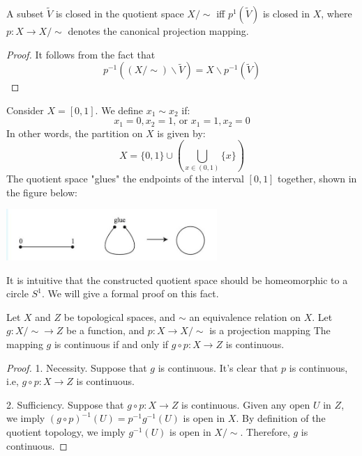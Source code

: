\begin{proposition} A subset \(\widetilde{V}\) is closed in the quotient space \(X/ \sim\) iff \({p}^{1}\left( \widetilde{V}\right)\) is closed in \(X\), where \(p: X \rightarrow  X/ \sim\) denotes the canonical projection mapping.
\end{proposition}
\begin{proof} It follows from the fact that
\[
{p}^{-1}\left( {\left( {X/ \sim  }\right)  \smallsetminus  \widetilde{V}}\right)  = X \smallsetminus  {p}^{-1}\left( \widetilde{V}\right)
\]
\end{proof}
\begin{example} \label{eg:circle_glue} Consider \(X = \left\lbrack  {0,1}\right\rbrack\). We define \({x}_{1} \sim  {x}_{2}\) if:
\[
{x}_{1} = 0,{x}_{2} = 1\text{, or }{x}_{1} = 1,{x}_{2} = 0
\]
In other words, the partition on \(X\) is given by:
\[
X = \{ 0,1\}  \cup  \left( {\mathop{\bigcup }\limits_{{x \in  \left( {0,1}\right) }}\{ x\} }\right)
\]
The quotient space "glues" the endpoints of the interval \(\left\lbrack  {0,1}\right\rbrack\) together, shown in the figure below:
\begin{center}
\includegraphics[width=0.6\textwidth]{images/Ch4_circle_glue.jpg}
\end{center}
It is intuitive that the constructed quotient space should be homeomorphic to a circle \({S}^{1}\). We will give a formal proof on this fact.
\end{example}

\begin{proposition} \label{prop:quotient_cont} Let \(X\) and \(Z\) be topological spaces, and \(\sim\) an equivalence relation on \(X\).
Let \(g: X/ \sim   \rightarrow  Z\) be a function, and \(p: X \rightarrow  X/ \sim\) is a projection mapping The mapping \(g\) is continuous if and only if \(g \circ  p: X \rightarrow  Z\) is continuous.
\end{proposition}

\begin{proof} 1. Necessity. Suppose that \(g\) is continuous. It’s clear that \(p\) is continuous, i.e, \(g \circ  p: X \rightarrow  Z\) is continuous.

2. Sufficiency. Suppose that \(g \circ  p: X \rightarrow  Z\) is continuous. Given any open \(U\) in \(Z\), we imply \({\left( g \circ  p\right) }^{-1}\left( U\right)  = {p}^{-1}{g}^{-1}\left( U\right)\) is open in \(X\). By definition of the quotient topology, we imply \({g}^{-1}\left( U\right)\) is open in \(X/ \sim\). Therefore, \(g\) is continuous.
\end{proof}

